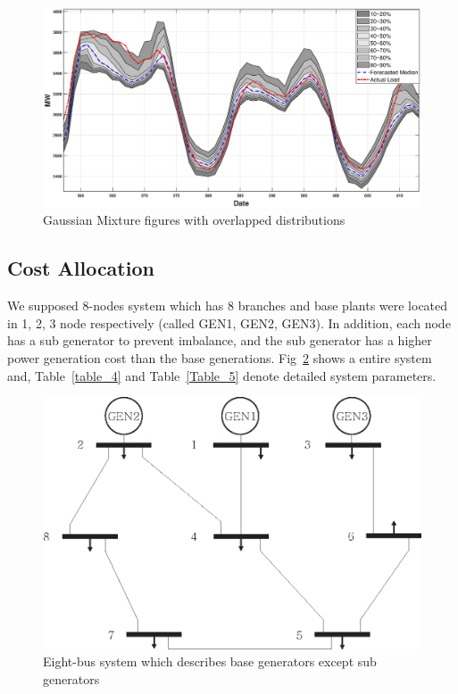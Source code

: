 \documentclass[journal]{IEEEtran} %
\begin{document}
\begin{figure}[h!]
\centering
  \includegraphics[width=\textwidth]{prob.eps}
\caption{Gaussian Mixture figures with overlapped distributions}
\label{fig:1}       %
\end{figure}






\subsection{Cost Allocation}
We supposed 8-nodes system which has 8 branches and base plants were located in 1, 2, 3 node respectively (called GEN1, GEN2, GEN3). In addition, each node has a sub generator to prevent imbalance, and the sub generator has a higher power generation cost than the base generations. Fig~\ref{system diagram} shows a entire system and, Table~\ref{table_4} and Table~\ref{Table_5} denote detailed system parameters.

\begin{figure}[h!]
\centering
  \includegraphics[width=1.0\linewidth]{system_diagram.eps}
\caption{Eight-bus system which describes base generators except sub generators}
\label{system diagram}       %
\end{figure}
\end{document}
